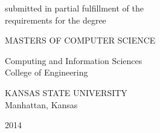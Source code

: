 \begin{center}
   \vspace{0.5cm}
   \begin{singlespace}
   submitted in partial fulfillment of the\\
   requirements for the degree\\
   \end{singlespace}

   \vspace{0.5cm}



   {\large MASTERS OF COMPUTER SCIENCE}\\
   \vspace{0.5cm}


   \begin{singlespace}
   Computing and Information Sciences\\
   College of Engineering\\
   \end{singlespace}

   \vspace{0.5cm}

   \begin{singlespace}
   {\Large KANSAS STATE UNIVERSITY}\\
   Manhattan, Kansas\\
   \end{singlespace}


   2014\\
   \vspace{1cm}

\end{center}
